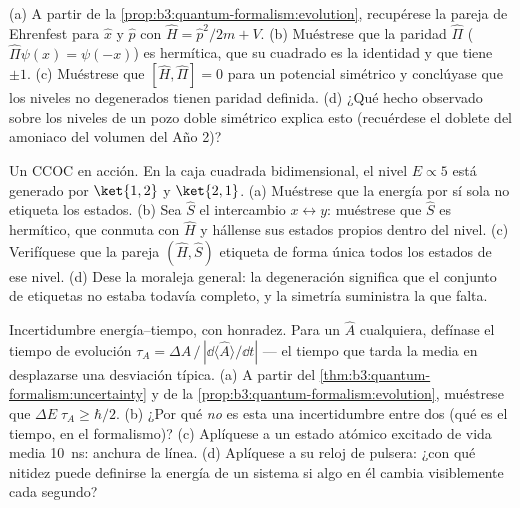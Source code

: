 \begin{exercise}[$\star\star$]\label{exo:b3:quantum-formalism:8}
(a) A partir de la \cref{prop:b3:quantum-formalism:evolution}, recupérese
la pareja de Ehrenfest para $\hat x$ y $\hat p$ con $\hat H = \hat
p^2/2m + V$. (b) Muéstrese que la paridad $\hat\Pi$ ($\hat\Pi\psi(x) =
\psi(-x)$) es hermítica, que su cuadrado es la identidad y que tiene
 $\pm1$. (c) Muéstrese que $[\hat H, \hat\Pi] = 0$ para un
potencial simétrico y conclúyase que los niveles no degenerados tienen paridad
definida. (d) ¿Qué hecho observado sobre los niveles de un pozo doble
simétrico explica esto (recuérdese el doblete del amoniaco del volumen del
Año 2)?
\end{exercise}

\begin{exercise}[$\star\star$]\label{exo:b3:quantum-formalism:9}
Un CCOC en acción. En la caja cuadrada bidimensional, el nivel $E
\propto 5$ está generado por $\ket{1,2}$ y $\ket{2,1}$. (a) Muéstrese
que la energía por sí sola no etiqueta los estados. (b) Sea $\hat S$ el
intercambio $x
\leftrightarrow y$: muéstrese que $\hat S$ es hermítico, que conmuta con $\hat
H$ y hállense sus estados propios dentro del nivel. (c) Verifíquese que la pareja $(\hat H, \hat S)$ etiqueta de forma única
todos los estados de ese nivel. (d) Dese la moraleja general:
la degeneración significa que el conjunto de etiquetas no estaba todavía
completo, y la simetría suministra la que falta.
\end{exercise}

\begin{exercise}[$\star\star\star$]\label{exo:b3:quantum-formalism:10}
Incertidumbre energía--tiempo, con honradez. Para un  $\hat A$
cualquiera, defínase el tiempo de evolución $\tau_A = \Delta A\,/\,|\dd\langle\hat
A\rangle/\dd t|$ --- el tiempo que tarda la media en desplazarse una
desviación típica. (a) A partir del \cref{thm:b3:quantum-formalism:uncertainty} y
de la \cref{prop:b3:quantum-formalism:evolution}, muéstrese que $\Delta
E\;\tau_A \ge \hbar/2$. (b) ¿Por qué \emph{no} es esta una incertidumbre
entre dos  (qué es el tiempo, en el formalismo)? (c) Aplíquese
a un estado atómico excitado de vida media \qty{10}{ns}: anchura de línea.
(d) Aplíquese a su reloj de pulsera: ¿con qué nitidez puede definirse la
energía de un sistema si algo en él cambia visiblemente cada segundo?
\end{exercise}

